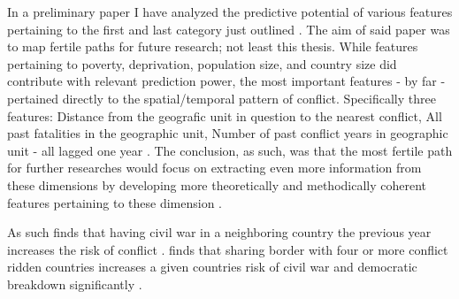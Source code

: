 In a preliminary paper I have analyzed the predictive potential of various features pertaining to the first and last category just outlined \citep{Maase}. The aim of said paper was to map fertile paths for future research; not least this thesis. While features pertaining to poverty, deprivation, population size, and country size did contribute with relevant prediction power, the most important features - by far - pertained directly to the spatial/temporal pattern of conflict. Specifically three features: Distance from  the geografic unit in question to the nearest conflict, All past fatalities in the geographic unit, Number of past conflict years in geographic unit - all lagged one year \citep[17-18]{Maase}. The conclusion, as such, was that the most fertile path for further researches would focus on extracting even more information from these dimensions by developing more theoretically and methodically coherent features pertaining to these dimension \citep[21-23]{Maase}.\par



As such \cite{Hegre_Sambanis_2006} finds that having civil war in a neighboring country the previous year increases the risk of conflict \citep[521-529]{Hegre_Sambanis_2006}. \cite{Goldstone_2010} finds that sharing border with four or more conflict ridden countries increases a given countries risk of civil war and democratic breakdown significantly \cite[195]{Goldstone_2010}. 



